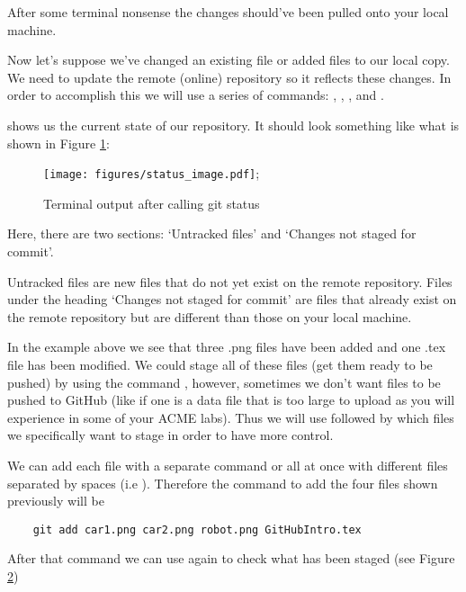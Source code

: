 After some terminal nonsense the changes should've been pulled onto your local machine. 

Now let's suppose we've changed an existing file or added files to our local copy. We need to update the remote (online) repository so it reflects these changes.
In order to accomplish this we will use a series of commands: , , , and .

 shows us the current state of our repository. It should look something like what is shown in Figure \ref{fig:status_figure}: 


\begin{figure}[h]
    \centering
    \caption{Terminal output after calling git status}
    {\texttt{[image: figures/status\_image.pdf]}};
    \label{fig:status_figure}
\end{figure}

Here, there are two sections: `Untracked files' and `Changes not staged for commit'. 

Untracked files are new files that do not yet exist on the remote repository.
Files under the heading `Changes not staged for commit' are files that already exist on the remote 
repository but are different than those on your local machine.

In the example above we see that three .png files have been added and one .tex file has been modified.
We could stage all of these files (get them ready to be pushed) by using the command , however, sometimes we don't want files to be pushed to GitHub
(like if one is a data file that is too large to upload as you will experience in some of your ACME labs). Thus we will use  followed by which files we 
specifically want to stage in order to have more control.

We can add each file with a separate  command or all at once with different files separated by spaces (i.e ). Therefore
the command to add the four files shown previously will be

\begin{lstlisting}
    git add car1.png car2.png robot.png GitHubIntro.tex
\end{lstlisting}

After that command we can use  again to check what has been staged (see Figure \ref{fig:staged})

\begin{figure}[h]
    \centering
    \label{fig:staged}
\end{figure}

